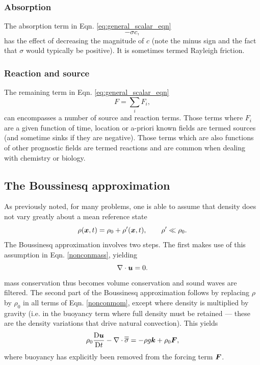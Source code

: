 \subsubsection{Absorption}
The absorption term in Eqn. \ref{eq:general_scalar_eqn} 
\begin{equation}\label{eq:scalar_absorption}
-\sigma c,
\end{equation}
has the effect of decreasing the magnitude of $c$ (note the minus sign and the fact that $\sigma$ would typically be positive). It is sometimes termed Rayleigh friction. 

\subsubsection{Reaction and source}
The remaining term in Eqn. \ref{eq:general_scalar_eqn}
\begin{equation}\label{eq:scalar_source}
F = \sum_i F_i,
\end{equation}
can encompasses a number of source and reaction terms. Those terms where $F_i$ are a given function of time, location or a-priori known fields are termed sources (and sometime sinks if they are negative). Those terms which are also functions of other prognostic fields are termed reactions and are common when dealing with chemistry or biology.




\subsection{The Boussinesq approximation} \label{sect:boussinesq_approximation}
As previously noted, for many problems, one is able to assume that density does not vary greatly about a mean reference state 
\begin{equation}\label{eq:densref}
\rho({\mbox{\boldmath$x$}},t) = \rho_0 + \rho'({\mbox{\boldmath$x$}},t),\qquad \rho'\ll\rho_0.
\end{equation}
The Boussinesq approximation involves two steps. The first makes use of this assumption in Eqn. \ref{nonconmass}, yielding 
\begin{equation}\label{eq:divfree}
\nabla\cdot{\mbox{\boldmath$u$}}=0.
\end{equation}
mass conservation thus becomes volume conservation and sound waves are filtered. The second part of the Boussinesq approximation follows by replacing $\rho$ by $\rho_0$ in all terms of Eqn. \ref{nonconmom}, except where density is multiplied by gravity (i.e. in the buoyancy term where full density must be retained --- these are the density variations that drive natural convection). This yields
\begin{equation}
\rho_0\frac{\mathrm{D}{\mbox{\boldmath$u$}}}{\mathrm{D} t} -\nabla\cdot\overline{\overline{\sigma}} = -\rho g{\mbox{\boldmath$k$}} +
\rho_0{\mbox{\boldmath$F$}},
\end{equation}
where buoyancy has explicitly been removed from the forcing term ${\mbox{\boldmath$F$}}$.

